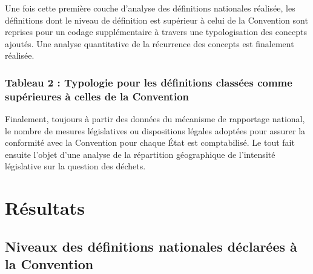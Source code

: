 \documentclass[12pt]{ulaval}
\begin{document}
Une fois cette première couche d'analyse des définitions nationales réalisée, les définitions dont le niveau de définition est supérieur à celui de la Convention sont reprises pour un codage supplémentaire à travers une typologisation des concepts ajoutés. Une analyse quantitative de la récurrence des concepts est finalement réalisée.

\subsubsection{Tableau 2 : Typologie pour les définitions classées comme supérieures à celles de la Convention}\label{tableau-2-typologie-pour-les-duxe9finitions-classuxe9es-comme-supuxe9rieures-uxe0-celles-de-la-convention}

Finalement, toujours à partir des données du mécanisme de rapportage national, le nombre de mesures législatives ou dispositions légales adoptées pour assurer la conformité avec la Convention pour chaque État est comptabilisé. Le tout fait ensuite l'objet d'une analyse de la répartition géographique de l'intensité législative sur la question des déchets.

\section{Résultats}\label{ruxe9sultats}

\subsection{Niveaux des définitions nationales déclarées à la Convention}\label{niveaux-des-duxe9finitions-nationales-duxe9claruxe9es-uxe0-la-convention}
\end{document}
